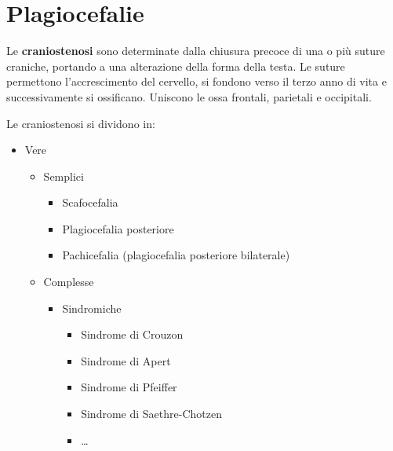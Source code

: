 \chapter{Plagiocefalie}
Le \textbf{craniostenosi} sono determinate dalla chiusura precoce di una o più suture craniche, portando a una alterazione della forma
della testa. Le suture permettono l'accrescimento del cervello, si fondono verso il terzo anno di vita e successivamente si ossificano.
Uniscono le ossa frontali, parietali e occipitali.

Le craniostenosi si dividono in:
\begin{itemize}																							                %
\item Vere																							                  	%
	\begin{itemize}																			                			%
	\item Semplici																			                			%
		\begin{itemize}																	                				%
		\item Scafocefalia																              				%
		\item Plagiocefalia posteriore															         		%
		\item Pachicefalia (plagiocefalia posteriore bilaterale)								%
		\end{itemize}																			                   		%
	\item Complesse																			                			%
		\begin{itemize}																		                			%
		\item Sindromiche																		                		%
			\begin{itemize}																	                			%
			\item Sindrome di Crouzon											            						%
			\item Sindrome di Apert												              					%
			\item Sindrome di Pfeiffer									          								%
			\item Sindrome di Saethre-Chotzen						          								%
			\item \dots																	                  				%
			\end{itemize}															                  					%

\end{itemize}
\end{itemize}
\end{itemize}
